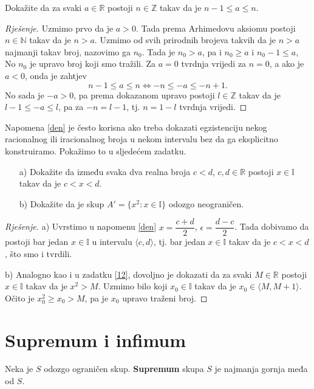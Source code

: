 \begin{exercise}
Dokažite da za svaki $a\in \mathbb{R}$ postoji $n\in \mathbb{Z}$ takav da je $n-1\leq a\leq n$.
\end{exercise}
\begin{proof}[Rješenje]
Uzmimo prvo da je $a>0$. Tada prema Arhimedovu aksiomu postoji $n\in \mathbb{N}$ takav da je $n>a$. Uzmimo od svih prirodnih brojeva takvih da je $n>a$ najmanji takav broj, nazovimo ga $n_0$. Tada je $n_0>a$, pa i $n_0\geq a$ i $n_0-1\leq a$, No $n_0$ je upravo broj koji smo tražili. Za $a=0$ tvrdnja vrijedi za $n=0$, a ako je $a<0$, onda je zahtjev 
$$n-1\leq a\leq n
\Longleftrightarrow -n\leq -a\leq -n+1.$$ 
No sada je $-a>0$, pa prema dokazanom upravo postoji $l\in \mathbb{Z}$ takav da je $l-1\leq -a\leq l$, pa za $-n=l-1$, tj. $n=1-l$ tvrdnja vrijedi.
\end{proof}
Napomena \ref{den} je često korisna ako treba dokazati egzistenciju nekog racionalnog ili iracionalnog broja u nekom intervalu bez da ga eksplicitno konstruiramo. Pokažimo to u sljedećem zadatku.
\begin{exercise} \textbf{}
\begin{itemize}
\item[a)] Dokažite da između svaka dva realna broja $c<d$, $c, d\in \mathbb{R}$ postoji $x\in \mathbb{I}$ takav da je $c<x<d$.
\item[b)] Dokažite da je skup $A'=\{x^2 : x\in \mathbb{I}\}$ odozgo neograničen.
\end{itemize}
\end{exercise}
\begin{proof}[Rješenje]
a) Uvrstimo u napomenu \ref{den} $x=\dfrac{c+d}{2}$, $\epsilon=\dfrac{d-c}{2}$. Tada dobivamo da postoji bar jedan $x\in \mathbb{I}$ u intervalu $\langle c, d\rangle$, tj. bar jedan $x\in \mathbb{I}$ takav da je $c<x<d$, što smo i tvrdili.

b) Analogno kao i u zadatku \ref{12}, dovoljno je dokazati da za svaki $M\in \mathbb{R}$ postoji $x\in \mathbb{I}$ takav da je $x^2>M$. Uzmimo bilo koji $x_0\in \mathbb{I}$ takav da je $x_0\in \langle M, M+1\rangle$. Očito je $x_0^2\geq x_0>M$, pa je $x_0$ upravo traženi broj.
\end{proof}
\section{Supremum i infimum}

\begin{definition}
Neka je $S$ odozgo ograničen skup. \textbf{Supremum} skupa $S$ je najmanja gornja međa od $S$.
\end{definition}

